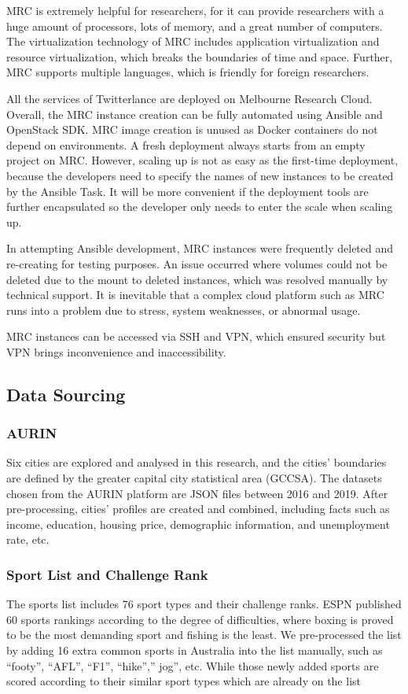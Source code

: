 MRC is extremely helpful for researchers, for it can provide researchers with a huge amount of processors, lots of memory, and a great number of computers. The virtualization technology of MRC includes application virtualization and resource virtualization, which breaks the boundaries of time and space. Further, MRC supports multiple languages, which is friendly for foreign researchers.

All the services of Twitterlance are deployed on Melbourne Research Cloud. Overall, the MRC instance creation can be fully automated using Ansible and OpenStack SDK. MRC image creation is unused as Docker containers do not depend on environments. A fresh deployment always starts from an empty project on MRC. However, scaling up is not as easy as the first-time deployment, because the developers need to specify the names of new instances to be created by the Ansible Task. It will be more convenient if the deployment tools are further encapsulated so the developer only needs to enter the scale when scaling up. 

In attempting Ansible development, MRC instances were frequently deleted and re-creating for testing purposes. An issue occurred where volumes could not be deleted due to the mount to deleted instances, which was resolved manually by technical support. It is inevitable that a complex cloud platform such as MRC runs into a problem due to stress, system weaknesses, or abnormal usage. 

MRC instances can be accessed via SSH and VPN, which ensured security but VPN brings inconvenience and inaccessibility. 


\subsection{Data Sourcing}
\subsubsection{AURIN}
Six cities are explored and analysed in this research, and the cities’ boundaries are defined by the greater capital city statistical area (GCCSA). The datasets chosen from the AURIN platform are JSON files between 2016 and 2019. After pre-processing, cities’ profiles are created and combined, including facts such as income, education, housing price, demographic information, and unemployment rate, etc.

\subsubsection{Sport List and Challenge Rank}
The sports list includes 76 sport types and their challenge ranks. ESPN published 60 sports rankings according to the degree of difficulties, where boxing is proved to be the most demanding sport and fishing is the least. We pre-processed the list by adding 16 extra common sports in Australia into the list manually, such as “footy”, “AFL”, “F1”, “hike”,” jog”, etc. While those newly added sports are scored according to their similar sport types which are already on the list

